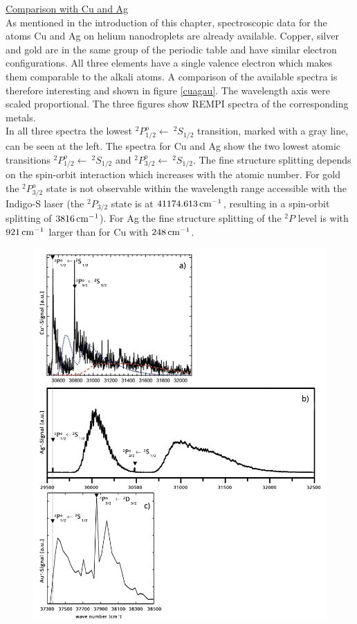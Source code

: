 \documentclass[parskip,12pt,headsepline,a4paper] {scrbook}
\begin{document}
\underline{Comparison with Cu and Ag} \\
As mentioned in the introduction of this chapter, spectroscopic data for the atoms Cu and Ag on helium nanodroplets are already available. Copper, silver and gold are in the same group of the periodic table and have similar electron configurations. All three elements have a single valence electron which makes them comparable to the alkali atoms. A comparison of the available spectra is therefore interesting and shown in figure \ref{cuagau}. The wavelength axis were scaled proportional. The three figures show REMPI spectra of the corresponding metals. \\
In all three spectra the lowest $^2P^o_{1/2} \leftarrow \ ^2S_{1/2}$ transition, marked with a gray line, can be seen at the left. The spectra for Cu and Ag show the two lowest atomic transitions $^2P^o_{1/2} \leftarrow \ ^2S_{1/2}$ and $^2P^o_{3/2} \leftarrow \ ^2S_{1/2}$. The fine structure splitting depends on the spin-orbit interaction which increases with the atomic number. For gold the $^2P^o_{3/2}$ state is not observable within the wavelength range accessible with the Indigo-S laser (the $^2P_{3/2}$ state is at $\unit[41 174.613]{cm^{-1}}$, resulting in a spin-orbit splitting of $\unit[3816]{cm^{-1}}$). For Ag the fine structure splitting of the $^2P$ level is with $\unit[921]{cm^{-1}}$ larger than for Cu with $\unit[248]{cm^{-1}}$.

\newpage

\begin{figure}[H]
\centerline{
\includegraphics[width=12cm]{./results/Cu_Ag_Au.jpg}}
\end{figure}
\end{document}
